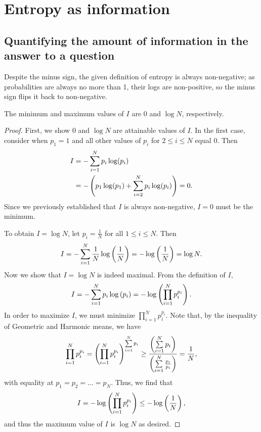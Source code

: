 \documentclass{paper}
\begin{document}
\section{Entropy as information}
\subsection{Quantifying the amount of information in the answer to a question}

\par Despite the minus sign, the given definition of entropy is always non-negative; as probabilities are always no more than 1, their logs are non-positive, so the minus sign flips it back to non-negative.

\begin{claim}
    The minimum and maximum values of $I$ are $0$ and $\log N$, respectively.
\end{claim}
    
\begin{proof}
    First, we show $0$ and $\log N$ are attainable values of $I$. In the first case, consider when $p_1=1$ and all other values of $p_i$ for $2\leq i \leq N$ equal $0$. Then
        \begin{align*}
            I &= -\sum\limits_{i=1}^{N} p_i\log(p_i)\\
            &= -\left( p_1\log(p_1) + \sum\limits_{i=2}^{N} p_i\log(p_i) \right) = 0.
        \end{align*}
    Since we previously established that $I$ is always non-negative, $I=0$ must be the minimum.
    
    To obtain $I=\log N$, let $p_i=\frac{1}{N}$ for all $1\leq i\leq N$. Then 
        \[
            I = -\sum\limits_{i=1}^{N} \frac{1}{N}\log\left(\frac{1}{N}\right)
            = -\log\left(\frac{1}{N}\right) = \log N.
        \]
    Now we show that $I=\log N$ is indeed maximal. From the definition of $I$,
        \[
            I = -\sum\limits_{i=1}^{N} p_i\log\left( p_i \right)
            = -\log\left( \prod\limits_{i=1}^{N} p_i^{p_i} \right).
        \]
    In order to maximize $I$, we must minimize $\prod\limits_{i=1}^{N} p_i^{p_i}$. Note that, by the inequality of Geometric and Harmonic means, we have
        \[
            \prod\limits_{i=1}^{N}p_i^{p_i} 
            = \left( \prod\limits_{i=1}^{N}p_i^{p_i} \right)^{\sum\limits_{i=1}^{N} p_i}
            \geq \frac{\left(\sum\limits_{i=1}^{N} p_i\right)}{\left(\sum\limits_{i=1}^{N} \frac{p_i}{p_i}\right)}
            = \frac{1}{N},
        \]
    with equality at $p_1=p_2=\ldots=p_N$. Thus, we find that
        \[
            I = -\log\left( \prod\limits_{i=1}^{N} p_i^{p_i}\right) \leq -\log\left(\frac{1}{N}\right),
        \]
    and thus the maximum value of $I$ is $\log N$ as desired.
\end{proof}
\end{document}
